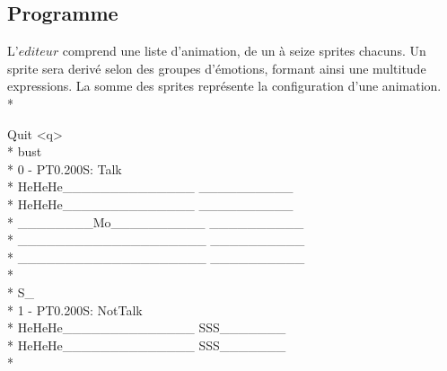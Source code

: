 \documentclass{report}
\newcommand{\dependency}{\textit{editeur}}
\begin{document}
\subsection{Programme \href{https://en.wikipedia.org/wiki/Text-based_user_interface}{\textendash{}}}

L'$\dependency$ comprend une liste d'animation, de un à seize sprites chacuns. Un sprite sera derivé selon des groupes d'émotions, formant ainsi une multitude expressions. La somme des sprites représente la configuration d'une animation. \\*

\begin{tabbing}
    Quit <q> \\*
    bust \\*
    0 - PT0.200S: Talk \\*
     HeHeHe\_\_\_\_\_\_\_\_\_\_\_\_\_\_ \_\_\_\_\_\_\_\_\_\_ \\*
     HeHeHe\_\_\_\_\_\_\_\_\_\_\_\_\_\_ \_\_\_\_\_\_\_\_\_\_ \\*
     \_\_\_\_\_\_\_\_Mo\_\_\_\_\_\_\_\_\_\_ \_\_\_\_\_\_\_\_\_\_ \\*
     \_\_\_\_\_\_\_\_\_\_\_\_\_\_\_\_\_\_\_\_ \_\_\_\_\_\_\_\_\_\_ \\*
     \_\_\_\_\_\_\_\_\_\_\_\_\_\_\_\_\_\_\_\_ \_\_\_\_\_\_\_\_\_\_ \\*
    \\*
    S\_ \\*
    1 - PT0.200S: NotTalk \\*
     HeHeHe\_\_\_\_\_\_\_\_\_\_\_\_\_\_ SSS\_\_\_\_\_\_\_ \\*
     HeHeHe\_\_\_\_\_\_\_\_\_\_\_\_\_\_ SSS\_\_\_\_\_\_\_ \\*

\end{tabbing}
\end{document}
